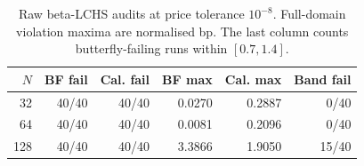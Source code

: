 \begin{table}[t]\centering\caption{Raw beta-LCHS audits at price tolerance $10^{-8}$. Full-domain violation maxima are normalised bp. The last column counts butterfly-failing runs within $[0.7,1.4]$.}
\label{tab:arb}\scriptsize\begin{tabular}{rrrrrr}\toprule $N$ & BF fail & Cal. fail & BF max & Cal. max & Band fail\\\midrule
32 & 40/40 & 40/40 & 0.0270 & 0.2887 & 0/40\\
64 & 40/40 & 40/40 & 0.0081 & 0.2096 & 0/40\\
128 & 40/40 & 40/40 & 3.3866 & 1.9050 & 15/40\\
\bottomrule\end{tabular}\end{table}